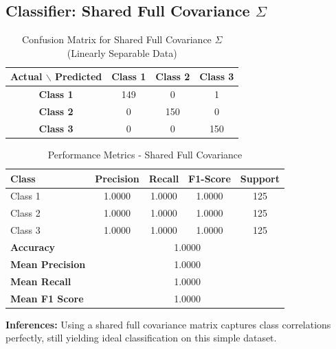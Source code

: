 \subsection{Classifier: Shared Full Covariance $\Sigma$}


\begin{table}[H]
\centering
\caption{Confusion Matrix for Shared Full Covariance $\Sigma$ (Linearly Separable Data)}
\label{tab:confmat_LSD_Shared_Full_Covariance_$\Sigma$}
\begin{tabular}{|c|c|c|c|}
\hline
\textbf{Actual $\backslash$ Predicted} & \textbf{Class 1} & \textbf{Class 2} & \textbf{Class 3} \\
\hline
\textbf{Class 1} & 149 & 0   & 1   \\
\textbf{Class 2} & 0  & 150 & 0   \\
\textbf{Class 3} & 0   & 0   & 150 \\
\hline
\end{tabular}
\end{table}


\begin{table}[H]
\centering
\caption{Performance Metrics - Shared Full Covariance}
\begin{tabular}{lcccc}
\toprule
\textbf{Class} & \textbf{Precision} & \textbf{Recall} & \textbf{F1-Score} & \textbf{Support} \\
\midrule
Class 1 & 1.0000 & 1.0000 & 1.0000 & 125 \\
Class 2 & 1.0000 & 1.0000 & 1.0000 & 125 \\
Class 3 & 1.0000 & 1.0000 & 1.0000 & 125 \\
\midrule
\textbf{Accuracy} & \multicolumn{4}{c}{1.0000} \\
\textbf{Mean Precision} & \multicolumn{4}{c}{1.0000} \\
\textbf{Mean Recall} & \multicolumn{4}{c}{1.0000} \\
\textbf{Mean F1 Score} & \multicolumn{4}{c}{1.0000} \\
\bottomrule
\end{tabular}
\end{table}

\textbf{Inferences:} Using a shared full covariance matrix captures class correlations perfectly, still yielding ideal classification on this simple dataset.

